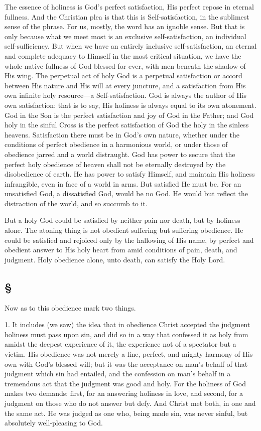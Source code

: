 \documentclass[draft]{ptfdoc}
\begin{document}
The essence of holiness is God's perfect 
satisfaction, His perfect repose in eternal fullness. 
And the Christian plea is that this is 
Self-satisfaction, in the sublimest sense of the 
phrase. For us, mostly, the word has an ignoble 
sense. But that is only because what we meet 
most is an exclusive self-satisfaction, an individual 
self-sufficiency. But when we have 
an entirely inclusive self-satisfaction, an eternal 
and complete adequacy to Himself in the most 
critical situation, we have the whole native fullness 
of God blessed for ever, with men beneath 
the shadow of His wing. The perpetual act of 
holy God is a perpetual satisfaction or accord 
between His nature and His will at every juncture, 
and a satisfaction from His own infinite 
holy resource---a Self-satisfaction. God is always 
the author of His own satisfaction: that is to say, 
His holiness is always equal to its own atonement. 
God in the Son is the perfect satisfaction 
and joy of God in the Father; and God holy 
in the sinful Cross is the perfect satisfaction of 
God the holy in the sinless heavens. Satisfaction 
there must be in God's own nature, whether 
under the conditions of perfect obedience in a 
harmonious world, or under those of obedience 
jarred and a world distraught. God has power 
to secure that the perfect holy obedience of 
heaven shall not be eternally destroyed by the 
disobedience of earth. He has power to satisfy 
Himself, and maintain His holiness infrangible, 
even in face of a world in arms. But satisfied He 
must be. For an unsatisfied God, a dissatisfied 
God, would be no God. He would but reflect the 
distraction of the world, and so succumb to it. 

But a holy God could be satisfied by neither 
pain nor death, but by holiness alone. The 
atoning thing is not obedient suffering but 
suffering obedience. He could be satisfied and 
rejoiced only by the hallowing of His name, 
by perfect and obedient answer to His holy 
heart from amid conditions of pain, death, and 
judgment. Holy obedience alone, unto death, 
can satisfy the Holy Lord. 

\subsection*{
\S
}

Now as to this obedience mark two things. 

1. It includes (we saw) the idea that in obedience 
Christ accepted the judgment holiness 
must pass upon sin, and did so in a way that 
confessed it as holy from amidst the deepest 
experience of it, the experience not of a spectator 
but a victim. His obedience was not 
merely a fine, perfect, and mighty harmony 
of His own with God's blessed will; but it 
was the acceptance on man's behalf of that 
judgment which sin had entailed, and the confession 
on man's behalf in a tremendous act 
that the judgment was good and holy. For the 
holiness of God makes two demands: first, for 
an answering holiness in love, and second, for a 
judgment on those who do not answer but defy. 
And Christ met both, in one and the same act. 
He was judged as one who, being made sin, was 
never sinful, but absolutely well-pleasing to God. 
\end{document}
